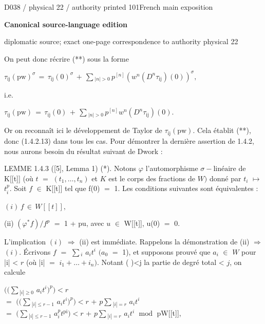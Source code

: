 \documentclass[9pt]{article}
\newcommand{\CanonText}[1]{\par{\fontsize{8.0}{9.35}\selectfont\RaggedRight #1\par}\vspace{2.2pt}}
\newcommand{\CanonDisplay}[1]{\par\vspace{1.2pt}\begin{center}{\fontsize{7.2}{8.4}\selectfont\(\displaystyle #1\)}\end{center}\vspace{1.2pt}}
\newcommand{\LayerTitle}{Canonical source-language edition}
\begin{document}
\newpage
\noindent\begin{minipage}[t][\dimexpr\textheight-5pt\relax][t]{\textwidth}
{\sffamily\fontsize{7.3}{8.2}\selectfont\color{Quiet} D038 / physical 22 / authority printed 101\hfill French main exposition}
\par{}\vspace{4.5pt}
{\sffamily\fontsize{10.4}{11.6}\selectfont\bfseries\color{Accent} \LayerTitle}
\par{\sffamily\fontsize{6.7}{7.7}\selectfont\color{Quiet} diplomatic source; exact one-page correspondence to authority physical 22}
\vspace{5pt}
\CanonText{On peut donc récrire (**) sous la forme}
\CanonDisplay{\tau{}_{\mathrm{ij}}(\text{pw})^\sigma{}\,=\,\tau{}_{\mathrm{ij}}(0)^\sigma{}\,+\,\sum{}_{|n|>0}\,p^{[n]}(w^{n}(D^{n}\tau{}_{\mathrm{ij}})(0))^\sigma{},}
\CanonText{i.e.}
\CanonDisplay{\tau{}_{\mathrm{ij}}(\text{pw})\,=\,\tau{}_{\mathrm{ij}}(0)\,+\,\sum{}_{|n|>0}\,p^{[n]}w^{n}(D^{n}\tau{}_{\mathrm{ij}})(0).}
\CanonText{Or on reconnaît ici le développement de Taylor de \(\tau{}_{\mathrm{ij}}(\text{pw})\). Cela établit (**), donc (1.4.2.13) dans tous les cas. Pour démontrer la dernière assertion de 1.4.2, nous aurons besoin du résultat suivant de Dwork :}
\CanonText{LEMME 1.4.3 ([5], Lemma 1) (*). Notons \(\varphi{}\) l'automorphisme \(\sigma{}-\text{linéaire}\) de K[[t]] (où \(t\) \(=\) \((t_{1},\ldots{},t_{n})\) et \(K\) est le corps des fractions de \(W)\) donné par \(t_{i}\) \(\mapsto{}\) \(t_{i}^{p}\). Soit \(f\) \(\in{}\) K[[t]] tel que f(0) \(=\) 1. Les conditions suivantes sont équivalentes :}
\CanonDisplay{(i)\,f\,\in{}\,W[[t]],}
\CanonText{(ii) \((\varphi{}^{*}f)/f^{p}\) \(=\) 1 + pu, avec \(u\) \(\in{}\) W[[t]], u(0) \(=\) 0.}
\CanonText{L'implication \((i)\) \(\Rightarrow{}\) (ii) est immédiate. Rappelons la démonstration de (ii) \(\Rightarrow{}\) \((i)\). Écrivons \(f\) \(=\) \(\sum{}_{i}\) \(a_{i}t^{i}\) \((a_{0}\) \(=\) 1), et supposons prouvé que \(a_{i}\) \(\in{}\) \(W\) pour |i| < \(r\) (où |i| \(=\) \(i_{1}+\ldots{}+i_{n})\). Notant ( )<j la partie de degré total < \(j\), on calcule}
\CanonText{\(((\sum{}_{|i|\geq{}0}\) \(a_{i}t^{i})^{p})<r\)\\\(=\) \(((\sum{}_{|i|\leq{}r-1}\) \(a_{i}t^{i})^{p})<r\) + \(p\sum{}_{|i|=r}\) \(a_{i}t^{i}\)\\\(=\) \((\sum{}_{|i|\leq{}r-1}\) \(a_{i}^{p}t^{\mathrm{pi}})<r\) + \(p\sum{}_{|i|=r}\) \(a_{i}t^{i}\) \(\operatorname{mod}\) pW[[t]],}

\end{minipage}
\end{document}
